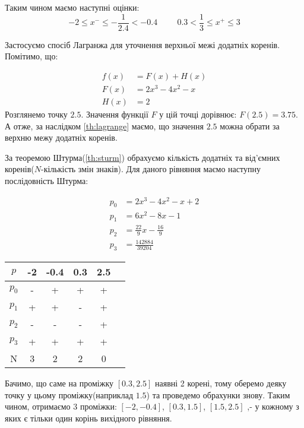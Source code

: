 Таким чином маємо наступні оцінки:
\[
    -2 \leq x^{-} \leq -\frac{1}{2.4} < -0.4 \hspace{1cm}
    0.3 < \frac{1}{3} \leq x^{+} \leq 3
\]

Застосуємо спосіб Лагранжа для уточнення верхньої межі додатніх коренів.
Помітимо, що:

\begin{align*}
    f(x) &= F(x) + H(x) \\
    F(x) &= 2x^3 - 4x^2 - x \\
    H(x) &= 2
\end{align*}
Розглянемо точку $2.5$. Значення функції $F$ у цій точці дорівнює:
$F(2.5) = 3.75$. А отже, за наслідком \ref{th:lagrange} маємо, що
значення $2.5$ можна обрати за верхню межу додатніх коренів.

За теоремою Штурма(\ref{th:sturm}) обрахуємо кількість додатніх та
від'ємних коренів($N$-кількість змін знаків).
Для даного рівняння маємо наступну послідовність Штурма:

\begin{align*}
    p_0 &= 2x^3 - 4x^2 - x + 2 \\
    p_1 &= 6x^2 - 8x -1 \\
    p_2 &= \frac{22}{9}x - \frac{16}{9} \\
    p_3 &= \frac{142884}{39204}
\end{align*}

\begin{table}[h!]
    \centering
    \begin{tabular}{|c|c|c|c|c|c|}
        \hline
        $p$ & -2 & -0.4 & 0.3 & 2.5 \\
        \hline
        $p_0$ & - & + & + & + \\
        \hline
        $p_1$ & + & + & - & + \\
        \hline
        $p_2$ & - & - & - & + \\
        \hline
        $p_3$ & + & + & + & + \\
        \hline
        N & 3 & 2 & 2 & 0 \\
        \hline
    \end{tabular}
\end{table}

Бачимо, що саме на проміжку $[0.3, 2.5]$ наявні 2 корені, тому
оберемо деяку точку у цьому проміжку(наприклад $1.5$) та
проведемо обрахунки знову. Таким чином, отримаємо 3 проміжки: $[-2, -0.4]$, $[0.3, 1.5]$, $[1.5, 2.5]$ ,- у кожному
з яких є тільки один корінь вихідного рівняння.

